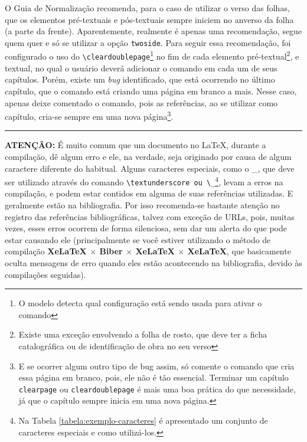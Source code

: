 O Guia de Normalização recomenda, para o caso de utilizar o verso das folhas, que os elementos pré-textuais e pós-textuais sempre iniciem no anverso da folha (a parte da frente). Aparentemente, realmente é apenas uma recomendação, segue quem quer e só se utilizar a opção \texttt{twoside}. Para seguir essa recomendação, foi configurado o uso do \verb|\cleardoublepage|\footnote{O modelo detecta qual configuração está sendo usada para ativar o comando} no fim de cada elemento pré-textual\footnote{Existe uma exceção envolvendo a folha de rosto, que deve ter a ficha catalográfica ou de identificação de obra no seu verso}, e textual, no qual o usuário deverá adicionar o comando em cada um de seus capítulos. Porém, existe um \textit{bug} identificado, que está ocorrendo no último capítulo, que o comando está criando uma página em branco a mais. Nesse caso, apenas deixe comentado o comando, pois as referências, ao se utilizar como capítulo, cria-se sempre em uma nova página\footnote{E se ocorrer algum outro tipo de bug assim, só comente o comando que cria essa página em branco, pois, ele não é tão essencial. Terminar um capítulo \texttt{clearpage} ou \texttt{cleardoublepage} é mais uma boa prática do que necessidade, já que o capítulo sempre inicia em uma nova página.}.


\vspace{\baselineskip}
\begin{Center}
    \rule{12cm}{1pt}
\end{Center}

\textbf{ATENÇÃO:} É muito comum que um documento no \LaTeX{}, durante a compilação, dê algum erro e ele, na verdade, seja originado por causa de algum caractere diferente do habitual. Alguns caracteres especiais, como o \_, que deve ser utilizado através do comando \verb|\textunderscore ou \_|\footnote{Na Tabela \ref{tabela:exemplo-caracteres} é apresentado um conjunto de caracteres especiais e como utilizá-los.}, levam a erros na compilação, e podem estar contidos em alguma de suas referências utilizadas. E geralmente estão na bibliografia. Por isso recomenda-se bastante atenção no registro das referências bibliográficas, talvez com exceção de URLs, pois, muitas vezes, esses erros ocorrem de forma silenciosa, sem dar um alerta do que pode estar causando ele (principalmente se você estiver utilizando o método de compilação \textbf{XeLaTeX $\times$ Biber $\times$ XeLaTeX $\times$ XeLaTeX}, que basicamente oculta mensagens de erro quando eles estão acontecendo na bibliografia, devido às compilações seguidas).